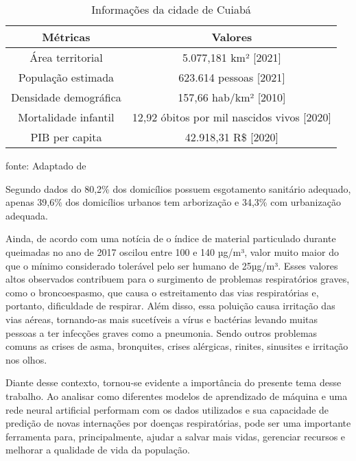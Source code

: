 \documentclass[
  12pt,		%
  a4paper,	%
  openright,%
  oneside,	%
  chapter=TITLE,		%
  section=TITLE,		%
  english,	%
  french,	%
  spanish,	%
  brazil	%
]{abntex2}
\begin{document}
    \begin{table}[ht]
        \centering
        \caption{Informações da cidade de Cuiabá}
        \label{tabela cuiaba}
        \begin{tabular}{cc}
            \hline
            \multicolumn{1}{|c|}{Métricas} & \multicolumn{1}{c|}{Valores}\\
            \hline
            Área territorial & 5.077,181 km² [2021]\\
            População estimada & 623.614 pessoas [2021]\\
            Densidade demográfica & 157,66 hab/km² [2010]\\
            Mortalidade infantil & 12,92 óbitos por mil nascidos vivos [2020]\\
            PIB per capita & 42.918,31 R\$ [2020]\\
            \hline
        \end{tabular}
        \par
        {\small fonte: Adaptado de \cite[]{ibge}}
    \end{table}

    Segundo dados do \cite[]{ibge_mais} 80,2\% dos domicílios possuem esgotamento
    sanitário adequado, apenas 39,6\% dos domicílios urbanos tem arborização e
    34,3\% com urbanização adequada.

    Ainda, de acordo com uma notícia de \cite[]{queimadas_cuiaba} o índice de material
    particulado durante queimadas no ano de 2017 oscilou entre 100 e 140 µg/m³, valor
    muito maior do que o mínimo considerado tolerável pelo ser humano de 25µg/m³. Esses valores
    altos observados contribuem para o surgimento de problemas respiratórios graves, como o
    broncoespasmo, que causa o estreitamento das vias respiratórias e, portanto, dificuldade de
    respirar. Além disso, essa poluição causa irritação das vias aéreas, tornando-as mais
    sucetíveis a vírus e bactérias levando muitas pessoas a ter infecções graves como a pneumonia. 
    Sendo outros problemas comuns as crises de asma, bronquites,
    crises alérgicas, rinites, sinusites e irritação nos olhos.

    Diante desse contexto, tornou-se evidente a importância do presente tema desse trabalho. Ao analisar
    como diferentes modelos de aprendizado de máquina e uma rede neural artificial performam com os dados
    utilizados e sua capacidade de predição de novas internações por doenças respiratórias, pode ser uma
    importante ferramenta para, principalmente, ajudar a salvar mais vidas, gerenciar recursos e
    melhorar a qualidade de vida da população.
\end{document}
